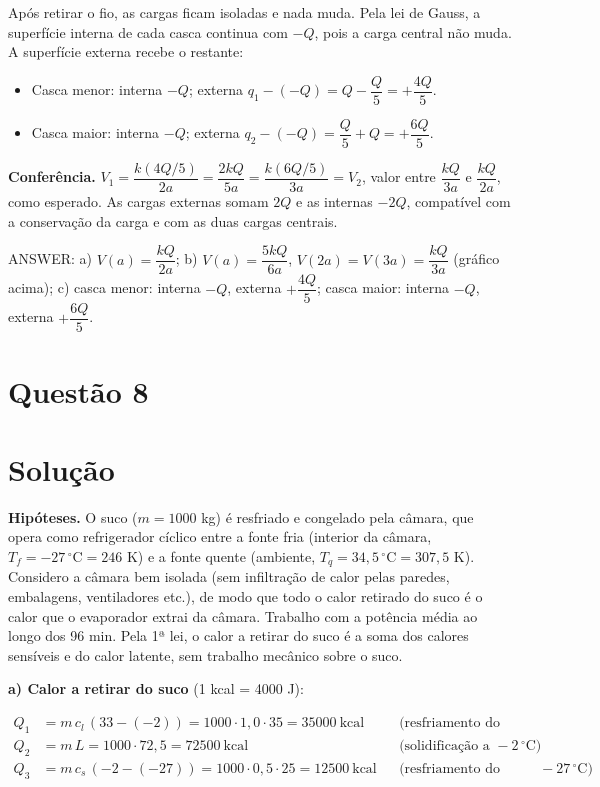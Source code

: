 \documentclass{article}%
\begin{document}
Após retirar o fio, as cargas ficam isoladas e nada muda. Pela lei de Gauss, a superfície interna de cada casca continua com $-Q$, pois a carga central não muda. A superfície externa recebe o restante:
\begin{itemize}
\item Casca menor: interna $-Q$; externa $q_1-(-Q)=Q-\dfrac{Q}{5}=+\dfrac{4Q}{5}$.
\item Casca maior: interna $-Q$; externa $q_2-(-Q)=\dfrac{Q}{5}+Q=+\dfrac{6Q}{5}$.
\end{itemize}

\textbf{Conferência.} $V_1=\dfrac{k(4Q/5)}{2a}=\dfrac{2kQ}{5a}=\dfrac{k(6Q/5)}{3a}=V_2$, valor entre $\dfrac{kQ}{3a}$ e $\dfrac{kQ}{2a}$, como esperado. As cargas externas somam $2Q$ e as internas $-2Q$, compatível com a conservação da carga e com as duas cargas centrais.

\medskip
\noindent ANSWER: a) $V(a)=\dfrac{kQ}{2a}$; b) $V(a)=\dfrac{5kQ}{6a}$, $V(2a)=V(3a)=\dfrac{kQ}{3a}$ (gráfico acima); c) casca menor: interna $-Q$, externa $+\dfrac{4Q}{5}$; casca maior: interna $-Q$, externa $+\dfrac{6Q}{5}$.%
\newpage%
\section*{Questão 8}

\section*{Solução}

\textbf{Hipóteses.} O suco ($m=1000$ kg) é resfriado e congelado pela câmara, que opera como refrigerador cíclico entre a fonte fria (interior da câmara, $T_f=-27\,^\circ\text{C}=246$ K) e a fonte quente (ambiente, $T_q=34{,}5\,^\circ\text{C}=307{,}5$ K). Considero a câmara bem isolada (sem infiltração de calor pelas paredes, embalagens, ventiladores etc.), de modo que todo o calor retirado do suco é o calor que o evaporador extrai da câmara. Trabalho com a potência média ao longo dos 96 min. Pela 1ª lei, o calor a retirar do suco é a soma dos calores sensíveis e do calor latente, sem trabalho mecânico sobre o suco.

\textbf{a) Calor a retirar do suco} (1 kcal = 4000 J):

\begin{align*}
Q_1 &= m\,c_{l}\,(33-(-2)) = 1000\cdot 1{,}0\cdot 35 = 35000\ \text{kcal} &&\text{(resfriamento do líquido até o congelamento)}\\
Q_2 &= m\,L = 1000\cdot 72{,}5 = 72500\ \text{kcal} &&\text{(solidificação a } -2\,^\circ\text{C)}\\
Q_3 &= m\,c_{s}\,(-2-(-27)) = 1000\cdot 0{,}5\cdot 25 = 12500\ \text{kcal} &&\text{(resfriamento do sólido até } -27\,^\circ\text{C)}
\end{align*}
\end{document}
